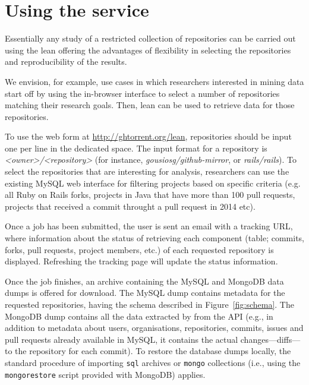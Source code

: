 
\section{Using the service}
\label{sec:usage}

Essentially any study of a restricted collection of \gh repositories can be carried out using the lean \ght offering the advantages of flexibility in selecting the repositories and reproducibility of the results.

We envision, for example, use cases in which researchers interested in mining \gh data start off by using the in-browser
interface to select a number of \gh repositories matching their research goals.
Then, lean \ght can be used to retrieve data for those repositories.

To use the web form at \url{http://ghtorrent.org/lean}, repositories should be input one per line in the dedicated space.
The input format for a repository is \emph{<owner>/<repository>} (for instance, \emph{gousiosg/github-mirror}, or \emph{rails/rails}). To select the repositories
that are interesting for analysis, researchers can use the existing \ght
MySQL web interface for filtering projects based on specific criteria (e.g.
all Ruby on Rails forks, projects in Java that have more than 100 pull requests,
projects that received a commit throught a pull request in 2014 etc).

Once a job has been submitted, the user is sent an email with a tracking URL, where information about the status of retrieving
each component (table; commits, forks, pull requests, project members, etc.) of each requested repository is displayed.
Refreshing the tracking page will update the status information.
%
%
%
%
%
%
%
%
%
%

Once the job finishes, an archive containing the MySQL and MongoDB data dumps is offered for download.
The MySQL dump contains metadata for the requested repositories, having the schema described in Figure~\ref{fig:schema}.
The MongoDB dump contains all the data extracted by \ght from the \gh API (e.g., in addition to metadata about users,
organisations, repositories, commits, issues and pull requests already available in MySQL, it contains the actual 
changes---diffs---to the repository for each commit).
%
To restore the database dumps locally, the standard procedure of importing \texttt{sql} archives or \texttt{mongo} collections
(i.e., using the \texttt{mongorestore} script provided with MongoDB) applies.

